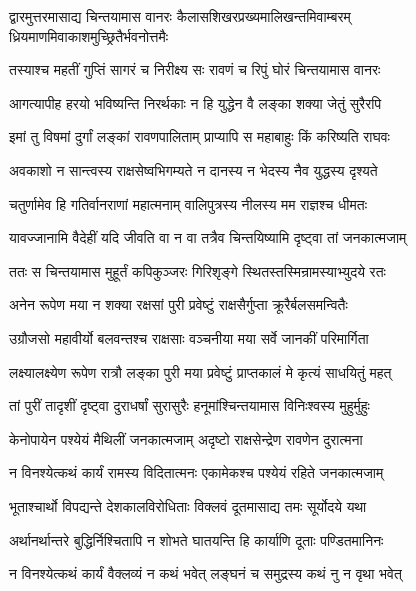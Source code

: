 \threelineshloka
{द्वारमुत्तरमासाद्य चिन्तयामास वानरः}
{कैलासशिखरप्रख्यमालिखन्तमिवाम्बरम्}
{ध्रियमाणमिवाकाशमुच्छ्रितैर्भवनोत्तमैः} %

\twolineshloka
{तस्याश्च महतीं गुप्तिं सागरं च निरीक्ष्य सः}
{रावणं च रिपुं घोरं चिन्तयामास वानरः} %

\twolineshloka
{आगत्यापीह हरयो भविष्यन्ति निरर्थकाः}
{न हि युद्धेन वै लङ्का शक्या जेतुं सुरैरपि} %

\twolineshloka
{इमां तु विषमां दुर्गां लङ्कां रावणपालिताम्}
{प्राप्यापि स महाबाहुः किं करिष्यति राघवः} %

\twolineshloka
{अवकाशो न सान्त्वस्य राक्षसेष्वभिगम्यते}
{न दानस्य न भेदस्य नैव युद्धस्य दृश्यते} %

\twolineshloka
{चतुर्णामेव हि गतिर्वानराणां महात्मनाम्}
{वालिपुत्रस्य नीलस्य मम राज्ञश्च धीमतः} %

\twolineshloka
{यावज्जानामि वैदेहीं यदि जीवति वा न वा}
{तत्रैव चिन्तयिष्यामि दृष्ट्वा तां जनकात्मजाम्} %

\twolineshloka
{ततः स चिन्तयामास मुहूर्तं कपिकुञ्जरः}
{गिरिशृङ्गे स्थितस्तस्मिन्रामस्याभ्युदये रतः} %

\twolineshloka
{अनेन रूपेण मया न शक्या रक्षसां पुरी}
{प्रवेष्टुं राक्षसैर्गुप्ता क्रूरैर्बलसमन्वितैः} %

\twolineshloka
{उग्रौजसो महावीर्यो बलवन्तश्च राक्षसाः}
{वञ्चनीया मया सर्वे जानकीं परिमार्गिता} %

\twolineshloka
{लक्ष्यालक्ष्येण रूपेण रात्रौ लङ्का पुरी मया}
{प्रवेष्टुं प्राप्तकालं मे कृत्यं साधयितुं महत्} %

\twolineshloka
{तां पुरीं तादृशीं दृष्ट्वा दुराधर्षां सुरासुरैः}
{हनूमांश्चिन्तयामास विनिःश्वस्य मुहुर्मुहुः} %

\twolineshloka
{केनोपायेन पश्येयं मैथिलीं जनकात्मजाम्}
{अदृष्टो राक्षसेन्द्रेण रावणेन दुरात्मना} %

\twolineshloka
{न विनश्येत्कथं कार्यं रामस्य विदितात्मनः}
{एकामेकश्च पश्येयं रहिते जनकात्मजाम्} %

\twolineshloka
{भूताश्चार्थो विपद्यन्ते देशकालविरोधिताः}
{विक्लवं दूतमासाद्य तमः सूर्योदये यथा} %

\twolineshloka
{अर्थानर्थान्तरे बुद्धिर्निश्चितापि न शोभते}
{घातयन्ति हि कार्याणि दूताः पण्डितमानिनः} %

\twolineshloka
{न विनश्येत्कथं कार्यं वैक्लव्यं न कथं भवेत्}
{लङ्घनं च समुद्रस्य कथं नु न वृथा भवेत्} %

